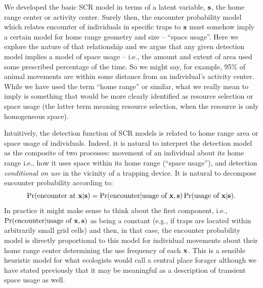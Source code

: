 We developed the basic SCR model in terms of a latent variable, ${\bf
  s}$, the home range center or activity center.  Surely then, the
encounter probability model which relates encounter of individuals in
specific traps to ${\bf s}$ must somehow imply a certain model for
home range geometry and size -- ``space usage''.  Here we explore the
nature of that relationship and we argue that any given detection
model implies a model of space usage -- i.e., the amount and extent of
area used some prescribed percentage of the time. So we might say,
for example, 95\% of animal movements are within some distance from an
individual's activity center.  While we have used the term ``home
range'' or similar, what we really mean to imply is something that
would be more clearly identified as
resource selection or space usage (the latter term meaning resource
selection, when the resource is only homogeneous space).

Intuitively, the detection function of SCR models is related to home
range area or space usage of individuals.  Indeed, it is natural
to interpret the detection model as the composite of two processes:
movement of an individual about its home range i.e., how it uses space
within its home range (``space usage''), and detection {\it
  conditional on use} in the vicinity of a trapping device.
It is natural to decompose encounter probability according to:
\[
 \Pr(\mbox{encounter at } {\bf x}|{\bf s})
 = \Pr(\mbox{encounter}| \mbox{usage of } {\bf x}, {\bf s})
\Pr(\mbox{usage of } {\bf x}|{\bf s}).
\]
In practice it might make sense to think about the first component,
i.e., $\Pr(\mbox{encounter} | \mbox{usage of } {\bf x}, {\bf s})$ as
being a constant (e.g., if traps are located within arbitrarily small
grid cells) and then, in that case, the encounter probability model is
directly proportional to this model for individual movements about
their home range center determining the use frequency of each ${\bf x}$.
This is a sensible heuristic model for what ecologists would call a
central place forager although we have stated previously that it may
be meaningful as a description of transient space usage as well.


